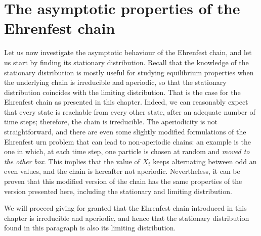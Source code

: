 \section{The asymptotic properties of the Ehrenfest chain}
Let us now investigate the asymptotic behaviour of the Ehrenfest chain, and let us start by finding its stationary distribution. Recall that the knowledge of the stationary distribution is mostly useful for studying equilibrium properties when the underlying chain is irreducible and aperiodic, so that the stationary distribution coincides with the limiting distribution. That is the case for the Ehrenfest chain as presented in this chapter. Indeed, we can reasonably expect that every state is reachable from every other state, after an adequate number of time steps; therefore, the chain is irreducible. The aperiodicity is not straightforward, and there are even some slightly modified formulations of the Ehrenfest urn problem that can lead to non-aperiodic chains: an example is the one in which, at each time step, one particle is chosen at random and \emph{moved to the other box}. This implies that the value of $X_t$ keeps alternating between odd an even values, and the chain is hereafter not aperiodic. Nevertheless, it can be proven that this modified version of the chain has the same properties of the version presented here, including the stationary and limiting distribution. 

We will proceed giving for granted that the Ehrenfest chain introduced in this chapter is irreducible and aperiodic, and hence that the stationary distribution found in this paragraph is also its limiting distribution.

